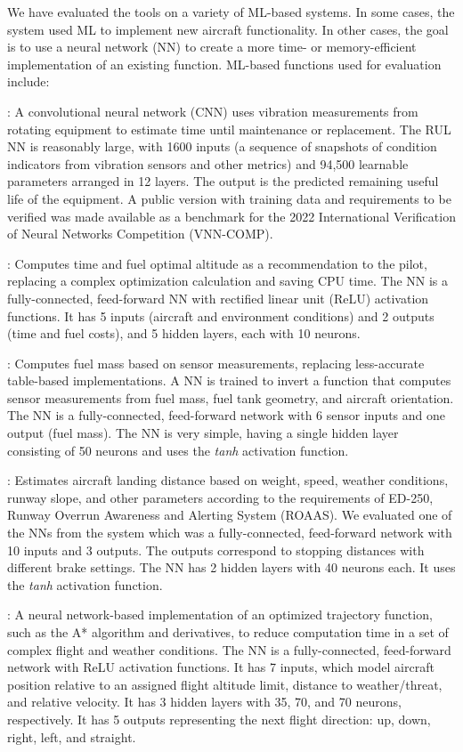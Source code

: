 We have evaluated the tools on a variety of ML-based systems.  In some cases, the system used ML to implement new aircraft functionality.  In other cases, the goal is to use a neural network (NN) to create a more time- or memory-efficient implementation of an existing function.  ML-based functions used for evaluation include:

:  A convolutional neural network (CNN) uses vibration measurements from rotating equipment to estimate time until maintenance or replacement.  The RUL NN is reasonably large, with 1600 inputs (a sequence of snapshots of condition indicators from vibration sensors and other metrics) and 94,500 learnable parameters arranged in 12 layers. The output is the predicted remaining useful life of the equipment. A public version with training data and requirements to be verified was made available as a benchmark for the 2022 International Verification of Neural Networks Competition (VNN-COMP).


:  Computes time and fuel optimal altitude as a recommendation to the pilot, replacing a complex optimization calculation and saving CPU time. The NN is a fully-connected, feed-forward NN with rectified linear unit (ReLU) activation functions. It has 5 inputs (aircraft and environment conditions) and 2 outputs (time and fuel costs), and 5 hidden layers, each with 10 neurons.


:  Computes fuel mass based on sensor measurements, replacing less-accurate table-based implementations.  A NN is trained to invert a function that computes sensor measurements from fuel mass, fuel tank geometry, and aircraft orientation.  The NN is a fully-connected, feed-forward network with 6 sensor inputs and one output (fuel mass). The NN is very simple, having a single hidden layer consisting of 50 neurons and uses the \emph{tanh} activation function. 


:  Estimates aircraft landing distance based on weight, speed, weather conditions, runway slope, and other parameters according to the requirements of ED-250, Runway Overrun Awareness and Alerting System (ROAAS).  We evaluated one of the NNs from the system which was a fully-connected, feed-forward network with 10 inputs and 3 outputs.  The outputs correspond to stopping distances with different brake settings. The NN has 2 hidden layers with 40 neurons each. It uses the \emph{tanh} activation function. 

: A neural network-based implementation of an optimized trajectory function, such as the A* algorithm and derivatives, to reduce computation time in a set of complex flight and weather conditions. The NN is a fully-connected, feed-forward network with ReLU activation functions. It has 7 inputs, which model aircraft position relative to an assigned flight altitude limit, distance to weather/threat, and relative velocity. It has 3 hidden layers with 35, 70, and 70 neurons, respectively. It has 5 outputs representing the next flight direction: up, down, right, left, and straight.


